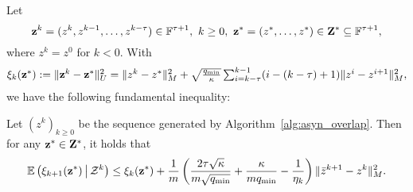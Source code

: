 Let 
\begin{equation*}%
\vz^k=(z^k,z^{k-1},\ldots,z^{k-\tau})\in \FF^{\tau+1},~k\ge 0,~\vz^* =(z^*,\ldots,z^*)\in\vZ^*\subseteq\FF^{\tau+1},
\end{equation*}
where $z^{k}=z^{0}$ for $k<0$. With
\begin{equation}\label{eqn:xi}
\textstyle \xi_k(\vz^*) := \|\vz^k-\vz^*\|_U^2=\|z^{k} - z^*\|_M^2 +
\sqrt{q_{\min}\over \kappa}\sum_{i=k-\tau}^{k-1} (i-(k-\tau)+1) \|
z^{i} - z^{i+1}\|_M^2,
\end{equation}
we have the following fundamental inequality:
\begin{thm}\label{thm:fund_inquality}
Let $(z^k)_{k\geq 0}$ be the sequence generated by Algorithm~\ref{alg:asyn_overlap}. Then for any ${\mathbf{z}}^*\in{\mathbf{Z}}^*$, it holds that %
\begin{equation*}%
\begin{aligned}
\mathbb{E}\left(\xi_{k+1}(\vz^*) \,\big|\, \cZ^k\right)  
\leq  \xi_k(\vz^*)  + \frac{1}{m}
\left(\frac{2\tau\sqrt{\kappa}}{m\sqrt{q_{\min}}} +
{\kappa\over mq_{\min}} - \frac{1}{ \eta_k}\right)
\|\bar{z}^{k+1} - z^k \|_M^2.
\end{aligned}
\end{equation*}
\end{thm}
